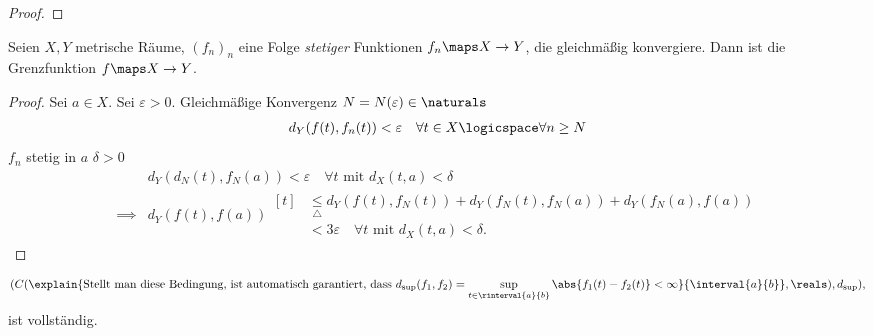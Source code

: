\begin{lemma}
\begin{eigenschaftenenumerate}
\begin{proof}
            
        \end{proof}
        \item \label{gleichmaessige_konvergenz_stetigkeit}Seien \( X,Y\) metrische Räume, \( (f_n)_n\) eine Folge \emph{stetiger} Funktionen \( f_n\maps X\to Y\), die gleichmäßig konvergiere. Dann ist die Grenzfunktion \( f\maps X\to Y\).
        \begin{proof}
            Sei \( a\in X\). Sei \( \varepsilon>0 \). Gleichmäßige Konvergenz \timplies \texists \( N=N(\varepsilon)\in \naturals \) \sd 
            \begin{align*}
                d_Y(f(t),f_n(t))<\varepsilon\quad \forall t\in X\logicspace \forall n\geq N
            \end{align*} 
            \( f_n\) stetig in \( a\) \timplies \texists \( \delta > 0 \) \sd
            \begin{align*}
                &d_Y(d_N(t),f_N(a))<\varepsilon\quad \forall t\text{ mit } d_X(t,a)<\delta\\
                \implies &d_Y(f(t),f(a))\begin{aligned}[t]
                    &\underset{\triangle}{\leq}d_Y(f(t),f_N(t))+d_Y(f_N(t),f_N(a))+d_Y(f_N(a),f(a))\\
                    &<3\varepsilon\quad \forall t\text{ mit }d_X(t,a)<\delta.
                \end{aligned}
            \end{align*}
            
        \end{proof}
         
    \end{eigenschaftenenumerate}
        
\end{lemma}
\begin{folgerung*}
    \begin{align*}
        (C(\explain{\text{Stellt man diese Bedingung, ist automatisch garantiert, dass \( d_{\sup}(f_1,f_2)=\sup_{t\in \rinterval{a}{b}}\abs{f_1(t)-f_2(t)}<\infty \)}}{\interval{a}{b}},\reals),d_{\sup}),
    \end{align*} ist vollständig.  
\end{folgerung*}

